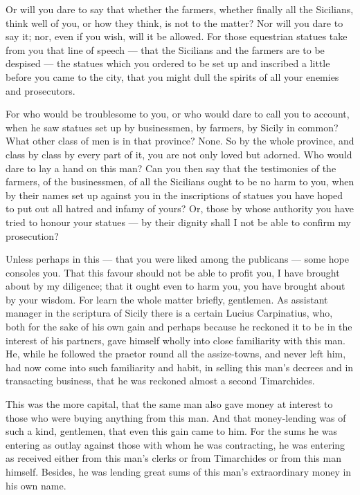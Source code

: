  Or will you dare to say that whether the farmers, whether finally all the Sicilians, think well of you, or how they think, is not to the matter? Nor will you dare to say it; nor, even if you wish, will it be allowed. For those equestrian statues take from you that line of speech --- that the Sicilians and the farmers are to be despised --- the statues which you ordered to be set up and inscribed a little before you came to the city, that you might dull the spirits of all your enemies and prosecutors.

 For who would be troublesome to you, or who would dare to call you to account, when he saw statues set up by businessmen, by farmers, by Sicily in common? What other class of men is in that province? None. So by the whole province, and class by class by every part of it, you are not only loved but adorned. Who would dare to lay a hand on this man? Can you then say that the testimonies of the farmers, of the businessmen, of all the Sicilians ought to be no harm to you, when by their names set up against you in the inscriptions of statues you have hoped to put out all hatred and infamy of yours? Or, those by whose authority you have tried to honour your statues --- by their dignity shall I not be able to confirm my prosecution?

 Unless perhaps in this --- that you were liked among the publicans --- some hope consoles you. That this favour should not be able to profit you, I have brought about by my diligence; that it ought even to harm you, you have brought about by your wisdom. For learn the whole matter briefly, gentlemen. As assistant manager in the scriptura of Sicily there is a certain Lucius Carpinatius, who, both for the sake of his own gain and perhaps because he reckoned it to be in the interest of his partners, gave himself wholly into close familiarity with this man. He, while he followed the praetor round all the assize-towns, and never left him, had now come into such familiarity and habit, in selling this man's decrees and in transacting business, that he was reckoned almost a second Timarchides.

 This was the more capital, that the same man also gave money at interest to those who were buying anything from this man. And that money-lending was of such a kind, gentlemen, that even this gain came to him. For the sums he was entering as outlay against those with whom he was contracting, he was entering as received either from this man's clerks or from Timarchides or from this man himself. Besides, he was lending great sums of this man's extraordinary money in his own name.

